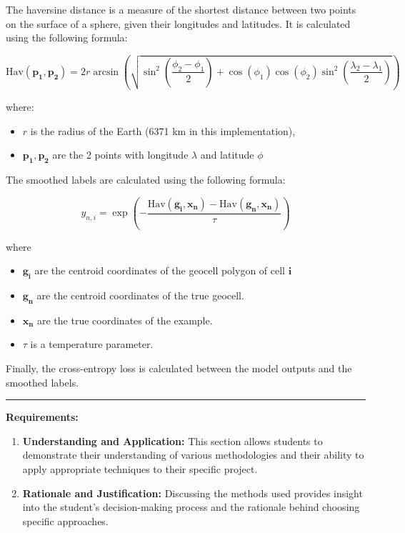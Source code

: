 \documentclass{article}
\providecommand{\tightlist}{%
  \setlength{\itemsep}{0pt}\setlength{\parskip}{0pt}}
\begin{document}
The haversine distance is a measure of the shortest distance between two
points on the surface of a sphere, given their longitudes and latitudes.
It is calculated using the following formula:

\[
\text{Hav}(\mathbf{p_1}, \mathbf{p_2}) = 2r \arcsin \left( \sqrt{\sin^2 \left( \frac{\phi_2 - \phi_1}{2} \right) + \cos(\phi_1) \cos(\phi_2) \sin^2 \left( \frac{\lambda_2 - \lambda_1}{2} \right)} \right)
\]

where:

\begin{itemize}
\tightlist
\item
  \(r\) is the radius of the Earth (6371 km in this implementation),
\item
  \(\mathbf{p_1}, \mathbf{p_2}\) are the 2 points with longitude
  \(\lambda\) and latitude \(\phi\)
\end{itemize}

The smoothed labels are calculated using the following formula:

\[
y_{n,i} = \exp \left( - \frac{\text{Hav}(\mathbf{g_i}, \mathbf{x_n}) - \text{Hav}(\mathbf{g_n}, \mathbf{x_n})}{\tau} \right)
\]

where

\begin{itemize}
\tightlist
\item
  \(\mathbf{g_i}\)\hspace{0pt} are the centroid coordinates of the
  geocell polygon of cell \(\mathbf{i}\)
\item
  \(\mathbf{g_n}\)\hspace{0pt} are the centroid coordinates of the true
  geocell.
\item
  \(\mathbf{x_n}\)\hspace{0pt} are the true coordinates of the example.
\item
  \(\tau\) is a temperature parameter.
\end{itemize}

Finally, the cross-entropy loss is calculated between the model outputs
and the smoothed labels.

\begin{center}\rule{0.5\linewidth}{0.5pt}\end{center}

\textbf{Requirements:}

\begin{enumerate}
\def\labelenumi{\arabic{enumi}.}
\tightlist
\item
  \textbf{Understanding and Application:} This section allows students
  to demonstrate their understanding of various methodologies and their
  ability to apply appropriate techniques to their specific project.
\item
  \textbf{Rationale and Justification:} Discussing the methods used
  provides insight into the student's decision-making process and the
  rationale behind choosing specific approaches.
\end{enumerate}
\end{document}
